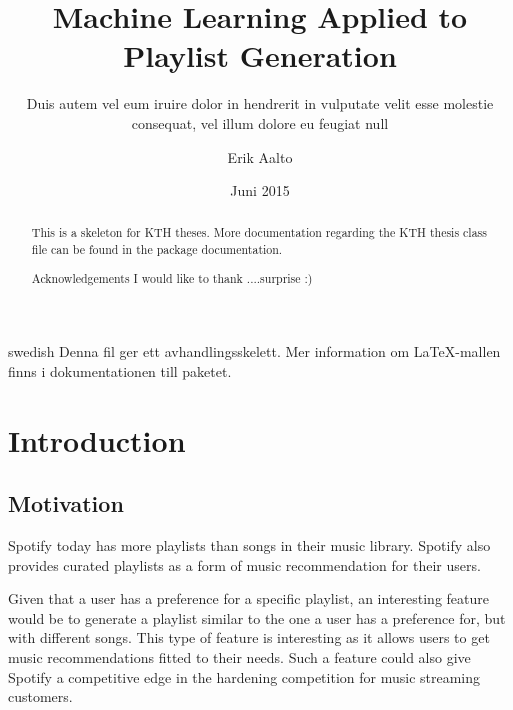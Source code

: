 \documentclass[a4paper,11pt]{kth-mag}
\title{Machine Learning Applied to Playlist Generation}
\subtitle{Duis autem vel eum iruire dolor in hendrerit in
          vulputate velit esse molestie consequat, vel illum
          dolore eu feugiat null}
\author{Erik Aalto}
\date{Juni 2015}
\begin{document}
\frontmatter
\pagestyle{empty}
\removepagenumbers
\maketitle
{}
\begin{abstract}
  This is a skeleton for KTH theses. More documentation
  regarding the KTH thesis class file can be found in
  the package documentation.


\end{abstract}
\clearpage
\begin{foreignabstract}{swedish}
  Denna fil ger ett avhandlingsskelett.
  Mer information om \LaTeX-mallen finns i
  dokumentationen till paketet.

\end{foreignabstract}
\begin{abstract}{Acknowledgements}
  I would like to thank ....surprise :)

\end{abstract}
\clearpage
\tableofcontents*
\mainmatter
\pagestyle{newchap}
\chapter{Introduction}

\section{Motivation}
Spotify today has more playlists than songs in their music library. Spotify also provides curated playlists as a form of music recommendation for their users. 

Given that a user has a preference for a specific playlist, an interesting feature would be to generate a playlist similar to the one a user has a preference for, but with different songs. This type of feature is interesting as it allows users to get music recommendations fitted to their needs. Such a feature could also give Spotify a competitive edge in the hardening competition for music streaming customers.
\end{document}
